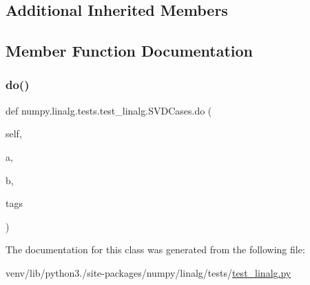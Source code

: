 \subsection*{Additional Inherited Members}


\subsection{Member Function Documentation}
\mbox{\label{classnumpy_1_1linalg_1_1tests_1_1test__linalg_1_1SVDCases_a15c07cc228ee81bd83669e3379210629}} 
\subsubsection{\texorpdfstring{do()}{do()}}
{\footnotesize\ttfamily def numpy.\+linalg.\+tests.\+test\+\_\+linalg.\+S\+V\+D\+Cases.\+do (\begin{DoxyParamCaption}\item[{}]{self,  }\item[{}]{a,  }\item[{}]{b,  }\item[{}]{tags }\end{DoxyParamCaption})}



The documentation for this class was generated from the following file\+:\begin{DoxyCompactItemize}
\item 
venv/lib/python3./site-\/packages/numpy/linalg/tests/\hyperlink{test__linalg_8py}{test\+\_\+linalg.\+py}\end{DoxyCompactItemize}
